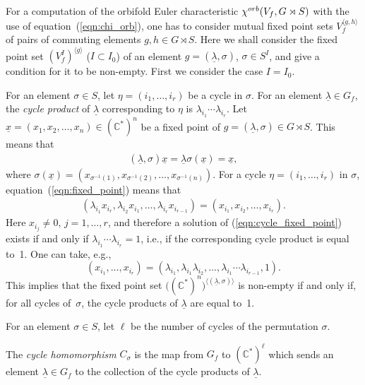 \documentclass[11pt]{article}
\numberwithin{equation}{section}
\numberwithin{equation}{section}
\begin{document}
For a computation of the orbifold Euler characteristic ${\chi}^{\rm orb}(V_f, G \rtimes S)$ with the use of
equation~(\ref{eqn:chi_orb}), one has to consider mutual fixed point sets $V_f^{\langle g,h\rangle}$ of pairs of
commuting elements $g, h\in G \rtimes S$. Here we shall consider the fixed point set
$(V_f^I)^{\langle g\rangle}$ ($I\subset I_0$) of an element $g=(\underline{\lambda}, \sigma)$, $\sigma \in S^I$,
and give a condition for it to be non-empty. First we consider the case $I=I_0$.

For an element $\sigma\in S$, let $\eta=(i_1,\dots, i_r)$ be a cycle in $\sigma$. For an element
$\underline{\lambda}\in G_f$, the {\em cycle product} of $\underline{\lambda}$ corresponding to $\eta$ is
$\lambda_{i_1}\cdots \lambda_{i_r}$. Let $\underline{x}=(x_1, x_2,\dots, x_n)\in ({\mathbb C}^*)^n$ be a fixed point of $g=(\underline{\lambda}, \sigma)\in G \rtimes S$. This means that
\begin{gather}\label{eqn:fixed_point}
(\underline{\lambda}, \sigma)\underline{x}=\underline{\lambda}\sigma(\underline{x})=\underline{x} ,
\end{gather}
where $\sigma(\underline{x})=(x_{\sigma^{-1}(1)}, x_{\sigma^{-1}(2)},\dots, x_{\sigma^{-1}(n)})$.
For a cycle $\eta=(i_1,\dots, i_r)$ in $\sigma$, equation~(\ref{eqn:fixed_point}) means that
\begin{gather}\label{eqn:cycle_fixed_point}
(\lambda_{i_1}x_{i_r}, \lambda_{i_2}x_{i_1},\dots, \lambda_{i_r}x_{i_{r-1}})=(x_{i_1}, x_{i_2},\dots, x_{i_r}) .
\end{gather}
Here $x_{i_j} \neq 0$, $j=1, \dots , r$, and therefore a solution of (\ref{eqn:cycle_fixed_point}) exists if and only if $\lambda_{i_1} \cdots \lambda_{i_r}=1$, i.e., if the corresponding cycle product is equal to~1. One can take, e.g.,
\[
(x_{i_1}, \dots , x_{i_r})=
(\lambda_{i_1}, \lambda_{i_1}\lambda_{i_2}, \dots , \lambda_{i_1} \cdots \lambda_{i_{r-1}},1).
\]
This implies that the fixed point set $\big(({\mathbb C}^*)^n\big)^{\langle (\underline{\lambda},\sigma) \rangle}$ is non-empty if and only if, for all cycles of~$\sigma$, the cycle products of $\underline{\lambda}$ are equal to~1.

For an element $\sigma \in S$, let $\ell$ be the number of cycles of the permutation $\sigma$.

\begin{Definition} The {\em cycle homomorphism} $C_\sigma$ is the map from $G_f$ to $({\mathbb C}^*)^\ell$ which sends an element $\underline{\lambda} \in G_f$ to the collection of the cycle products of $\underline{\lambda}$.
\end{Definition}
\end{document}
